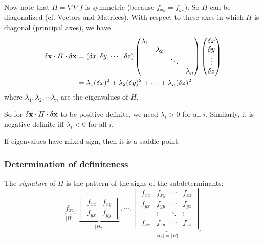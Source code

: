 \documentclass[a4paper]{article}
\begin{document}
  Now note that $H = \nabla\nabla f$ is symmetric (because $f_{xy} = f_{yx}$). So $H$ can be diagonalized (cf. Vectors and Matrices). With respect to these axes in which $H$ is diagonal (principal axes), we have
  \begin{align*}
    \delta\mathbf{x}\cdot H\cdot \delta\mathbf{x} &= (\delta x, \delta y, \cdots, \delta z)
    \begin{pmatrix}
      \lambda_1\\
      &\lambda_2\\
      &&\ddots\\
      &&&\lambda_n
    \end{pmatrix}
    \begin{pmatrix}
      \delta x\\\delta y\\\vdots\\\delta z
    \end{pmatrix}\\
    &= \lambda_1(\delta x)^2 + \lambda_2 (\delta y)^2 + \cdots + \lambda_n(\delta z)^2
  \end{align*}
  where $\lambda_1, \lambda_2, \cdots \lambda_n$ are the eigenvalues of $H$. 

  So for $\delta \mathbf{x}\cdot H\cdot \delta \mathbf{x}$ to be positive-definite, we need $\lambda_i > 0$ for all $i$. Similarly, it is negative-definite iff $\lambda_i < 0$ for all $i$.

  If eigenvalues have mixed sign, then it is a saddle point.

  \subsubsection{Determination of definiteness}
  \begin{defi}
    The \emph{signature} of $H$ is the pattern of the signs of the subdeterminants:
    \[
      \underbrace{f_{xx}}_{|H_1|}, 
      \underbrace{
        \begin{vmatrix}
          f_{xx} & f_{xy}\\
          f_{yx} & f_{yy}
        \end{vmatrix}}_{|H_2|},\cdots, 
        \underbrace{\begin{vmatrix}
          f_{xx} & f_{xy} & \cdots & f_{xz}\\
          f_{yx} & f_{yy} & \cdots & f_{yz}\\
          \vdots & \vdots & \ddots & \vdots\\
          f_{zx} & f_{zy} & \cdots & f_{zz}
        \end{vmatrix}}_{|H_n| = |H|}
      \]
    \end{defi}
\end{document}
